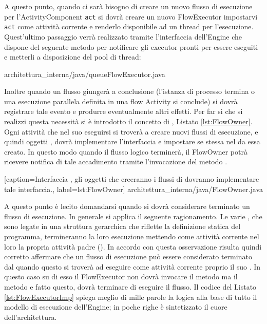 A questo punto, quando ci sarà bisogno di creare un nuovo flusso di esecuzione
per l'ActivityComponent \texttt{act} si dovrà creare un nuovo FlowExecutor
impostarvi \texttt{act} come attività corrente e renderlo disponibile ad un thread per
l'esecuzione. Quest'ultimo passaggio verrà realizzato tramite l'interfaccia
dell'Engine che dispone del seguente metodo per notificare gli executor pronti
per essere eseguiti e metterli a disposizione del pool di thread:

 {architettura_interna/java/queueFlowExecutor.java}

Inoltre quando un flusso giungerà a conclusione (l'istanza di processo termina o
una esecuzione parallela definita in una flow Activity si conclude) si dovrà
registrare tale evento e produrre eventualmente altri effetti. Per far si che si
realizzi questa necessità si \`e introdotto il concetto di ,
Listato \ref{lst:FlowOwner}. Ogni attività che nel suo eseguirsi si
troverà a creare nuovi flussi di esecuzione, e quindi oggetti ,  dovrà implementare
l'interfaccia  e impostare se stessa nel 
da essa creato. In questo modo quando il flusso logico terminerà, il FlowOwner potrà
ricevere notifica di tale accadimento tramite l'invocazione del metodo
.


[caption={Interfaccia , gli oggetti che creeranno i flussi di
dovranno implementare tale interfaccia.}, label=lst:FlowOwner]
{architettura_interna/java/FlowOwner.java}

A questo punto \`e lecito domandarsi quando si dovrà considerare terminato un
flusso di esecuzione. In generale si applica il seguente ragionamento. Le varie
, che sono legate in una struttura gerarchica che
riflette la definizione statica del programma, termineranno la loro esecuzione
mettendo come attività corrente nel loro  la propria attività
padre (). In accordo con questa osservazione risulta
quindi corretto affermare che un flusso di esecuzione può essere considerato
terminato dal  quando questo si troverà ad eseguire come
attività corrente proprio il suo . In questo caso su di esso il
FlowExecutor non dovrà invocare il metodo  ma il metodo
 e fatto questo, dovrà terminare di eseguire il flusso. Il
codice del Listato \ref{lst:FlowExecutorImp} spiega meglio di mille parole la
logica alla base di tutto il modello di esecuzione dell'Engine; in poche righe \`e sintetizzato il cuore
dell'architettura.

